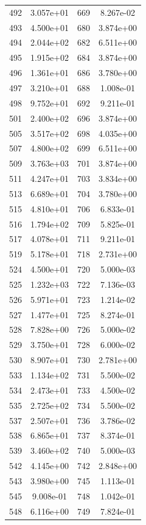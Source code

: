 \documentclass[12pt]{article}
\begin{document}
\begin{longtable}{@{}cccc@{}}
492 & 3.057e+01 & 669 & 8.267e-02 \\
493 & 4.500e+01 & 680 & 3.874e+00 \\
494 & 2.044e+02 & 682 & 6.511e+00 \\
495 & 1.915e+02 & 684 & 3.874e+00 \\
496 & 1.361e+01 & 686 & 3.780e+00 \\
497 & 3.210e+01 & 688 & 1.008e-01 \\
498 & 9.752e+01 & 692 & 9.211e-01 \\
501 & 2.400e+02 & 696 & 3.874e+00 \\
505 & 3.517e+02 & 698 & 4.035e+00 \\
507 & 4.800e+02 & 699 & 6.511e+00 \\
509 & 3.763e+03 & 701 & 3.874e+00 \\
511 & 4.247e+01 & 703 & 3.834e+00 \\
513 & 6.689e+01 & 704 & 3.780e+00 \\
515 & 4.810e+01 & 706 & 6.833e-01 \\
516 & 1.794e+02 & 709 & 5.825e-01 \\
517 & 4.078e+01 & 711 & 9.211e-01 \\
519 & 5.178e+01 & 718 & 2.731e+00 \\
524 & 4.500e+01 & 720 & 5.000e-03 \\
525 & 1.232e+03 & 722 & 7.136e-03 \\
526 & 5.971e+01 & 723 & 1.214e-02 \\
527 & 1.477e+01 & 725 & 8.274e-01 \\
528 & 7.828e+00 & 726 & 5.000e-02 \\
529 & 3.750e+01 & 728 & 6.000e-02 \\
530 & 8.907e+01 & 730 & 2.781e+00 \\
533 & 1.134e+02 & 731 & 5.500e-02 \\
534 & 2.473e+01 & 733 & 4.500e-02 \\
535 & 2.725e+02 & 734 & 5.500e-02 \\
537 & 2.507e+01 & 736 & 3.786e-02 \\
538 & 6.865e+01 & 737 & 8.374e-01 \\
539 & 3.460e+02 & 740 & 5.000e-03 \\
542 & 4.145e+00 & 742 & 2.848e+00 \\
543 & 3.980e+00 & 745 & 1.113e-01 \\
545 & 9.008e-01 & 748 & 1.042e-01 \\
548 & 6.116e+00 & 749 & 7.824e-01 \\

\end{longtable}
\end{document}
